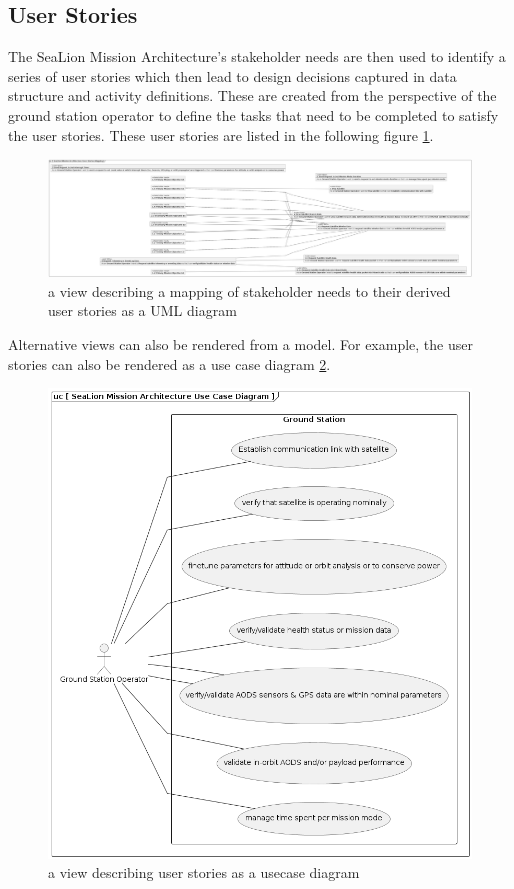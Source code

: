 \documentclass[conf]{new-aiaa}
\begin{document}
\subsection{User Stories}

The SeaLion Mission Architecture's stakeholder needs are then used to identify a series of user stories which then lead to design decisions captured in data structure and activity definitions. These are created from the perspective of the ground station operator to define the tasks that need to be completed to satisfy the user stories. These user stories are listed in the following figure \ref{user-stories-mapping}.

\begin{figure}[hbt!]
    \centering
    \includegraphics[width=.8\textwidth]{user-stories-mapping}
    \caption{a view describing a mapping of stakeholder needs to their derived user stories as a UML diagram}
    \label{user-stories-mapping}
\end{figure}

Alternative views can also be rendered from a model. For example, the user stories can also be rendered as a use case diagram \ref{use-case-diagram}.
\begin{figure}[hbt!]
    \centering
    \includegraphics[width=.8\textwidth]{use-case-diagram}
    \caption{a view describing user stories as a usecase diagram}
    \label{use-case-diagram}
\end{figure}
\end{document}
